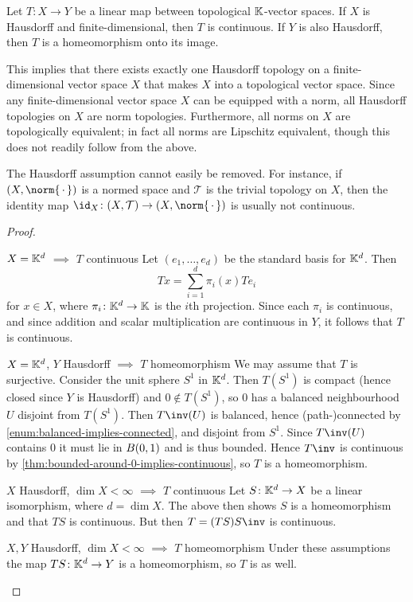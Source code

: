 \documentclass[article, a4paper, 11pt, oneside]{memoir}
\numberwithin{equation}{chapter}
\newcommand{\calT}{\mathcal{T}}
\begin{document}
\begin{theorem}
    \label{thm:domain-finite-dimensional-continuity}
    Let $T \colon X \to Y$ be a linear map between topological $\mathbb{K}$-vector spaces. If $X$ is Hausdorff and finite-dimensional, then $T$ is continuous. If $Y$ is also Hausdorff, then $T$ is a homeomorphism onto its image.
\end{theorem}
%
This implies that there exists exactly one Hausdorff topology on a finite-dimensional vector space $X$ that makes $X$ into a topological vector space. Since any finite-dimensional vector space $X$ can be equipped with a norm, all Hausdorff topologies on $X$ are norm topologies. Furthermore, all norms on $X$ are topologically equivalent; in fact all norms are Lipschitz equivalent, though this does not readily follow from the above.

The Hausdorff assumption cannot easily be removed. For instance, if $(X, \norm{\,\cdot\,})$ is a normed space and $\calT$ is the trivial topology on $X$, then the identity map $\id_X \colon (X, \calT) \to (X, \norm{\,\cdot\,})$ is usually not continuous.

\begin{proof}
\begin{proofsec}
    \item[$X = \mathbb{K}^d$ $\implies$ $T$ continuous]
    Let $(e_1, \ldots, e_d)$ be the standard basis for $\mathbb{K}^d$. Then
    \begin{equation*}
        Tx = \sum_{i=1}^d \pi_i(x) Te_i
    \end{equation*}
    for $x \in X$, where $\pi_i \colon \mathbb{K}^d \to \mathbb{K}$ is the $i$th projection. Since each $\pi_i$ is continuous, and since addition and scalar multiplication are continuous in $Y$, it follows that $T$ is continuous.

    \item[$X = \mathbb{K}^d$, $Y$ Hausdorff $\implies$ $T$ homeomorphism]
    We may assume that $T$ is surjective. Consider the unit sphere $S^1$ in $\mathbb{K}^d$. Then $T(S^1)$ is compact (hence closed since $Y$ is Hausdorff) and $0 \not\in T(S^1)$, so $0$ has a balanced neighbourhood $U$ disjoint from $T(S^1)$. Then $T\inv(U)$ is balanced, hence (path-)connected by \cref{enum:balanced-implies-connected}, and disjoint from $S^1$. Since $T\inv(U)$ contains $0$ it must lie in $B_{}(0,1)$ and is thus bounded. Hence $T\inv$ is continuous by \cref{thm:bounded-around-0-implies-continuous}, so $T$ is a homeomorphism.
    
    \item[$X$ Hausdorff, $\dim X < \infty$ $\implies$ $T$ continuous]
    Let $S \colon \mathbb{K}^d \to X$ be a linear isomorphism, where $d = \dim X$. The above then shows $S$ is a homeomorphism and that $TS$ is continuous. But then $T = (TS)S\inv$ is continuous.

    \item[$X,Y$ Hausdorff, $\dim X < \infty$ $\implies$ $T$ homeomorphism]
    Under these assumptions the map $TS \colon \mathbb{K}^d \to Y$ is a homeomorphism, so $T$ is as well.
\end{proofsec}
\end{proof}
\end{document}
